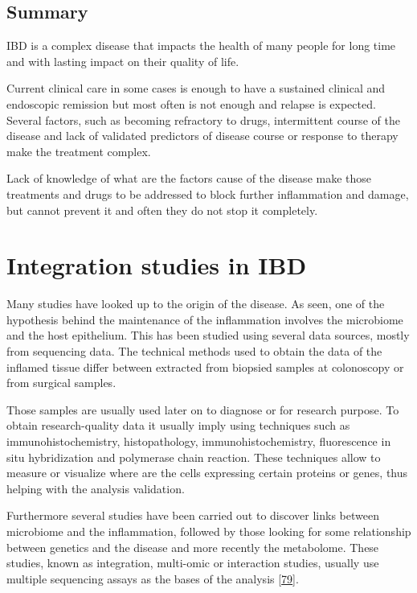 \documentclass[
  12pt,
  a4paper,
  twoside,
  openright]{book}
\begin{document}
\hypertarget{summary-ibd}{%
\subsection{Summary}\label{summary-ibd}}

IBD is a complex disease that impacts the health of many people for long time and with lasting impact on their quality of life.

Current clinical care in some cases is enough to have a sustained clinical and endoscopic remission but most often is not enough and relapse is expected.
Several factors, such as becoming refractory to drugs, intermittent course of the disease and lack of validated predictors of disease course or response to therapy make the treatment complex.

Lack of knowledge of what are the factors cause of the disease make those treatments and drugs to be addressed to block further inflammation and damage, but cannot prevent it and often they do not stop it completely.

\hypertarget{integration-studies-in-ibd}{%
\section{Integration studies in IBD}\label{integration-studies-in-ibd}}

Many studies have looked up to the origin of the disease.
As seen, one of the hypothesis behind the maintenance of the inflammation involves the microbiome and the host epithelium.
This has been studied using several data sources, mostly from sequencing data.
The technical methods used to obtain the data of the inflamed tissue differ between extracted from biopsied samples at colonoscopy or from surgical samples.

Those samples are usually used later on to diagnose or for research purpose.
To obtain research-quality data it usually imply using techniques such as immunohistochemistry, histopathology, immunohistochemistry, fluorescence in situ hybridization and polymerase chain reaction.
These techniques allow to measure or visualize where are the cells expressing certain proteins or genes, thus helping with the analysis validation.

Furthermore several studies have been carried out to discover links between microbiome and the inflammation, followed by those looking for some relationship between genetics and the disease and more recently the metabolome.
These studies, known as integration, multi-omic or interaction studies, usually use multiple sequencing assays as the bases of the analysis {[}\protect\hyperlink{ref-beck2021}{79}{]}.
\end{document}
